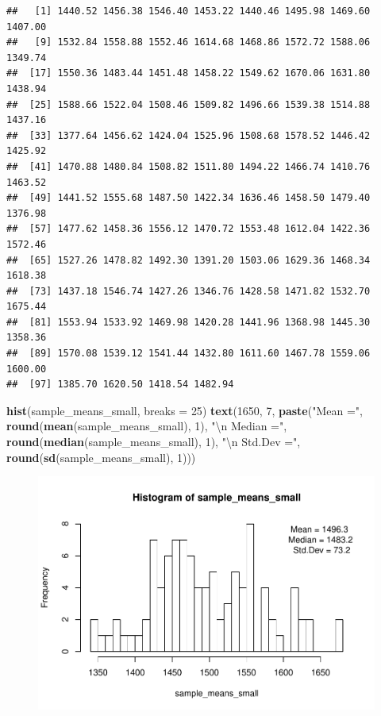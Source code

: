 \documentclass[]{article}
\newenvironment{Shaded}{\begin{snugshade}}{\end{snugshade}}
\newcommand{\KeywordTok}[1]{\textcolor[rgb]{0.13,0.29,0.53}{\textbf{{#1}}}}
\newcommand{\DataTypeTok}[1]{\textcolor[rgb]{0.13,0.29,0.53}{{#1}}}
\newcommand{\DecValTok}[1]{\textcolor[rgb]{0.00,0.00,0.81}{{#1}}}
\newcommand{\CharTok}[1]{\textcolor[rgb]{0.31,0.60,0.02}{{#1}}}
\newcommand{\StringTok}[1]{\textcolor[rgb]{0.31,0.60,0.02}{{#1}}}
\newcommand{\NormalTok}[1]{{#1}}
\begin{document}
\begin{verbatim}
##   [1] 1440.52 1456.38 1546.40 1453.22 1440.46 1495.98 1469.60 1407.00
##   [9] 1532.84 1558.88 1552.46 1614.68 1468.86 1572.72 1588.06 1349.74
##  [17] 1550.36 1483.44 1451.48 1458.22 1549.62 1670.06 1631.80 1438.94
##  [25] 1588.66 1522.04 1508.46 1509.82 1496.66 1539.38 1514.88 1437.16
##  [33] 1377.64 1456.62 1424.04 1525.96 1508.68 1578.52 1446.42 1425.92
##  [41] 1470.88 1480.84 1508.82 1511.80 1494.22 1466.74 1410.76 1463.52
##  [49] 1441.52 1555.68 1487.50 1422.34 1636.46 1458.50 1479.40 1376.98
##  [57] 1477.62 1458.36 1556.12 1470.72 1553.48 1612.04 1422.36 1572.46
##  [65] 1527.26 1478.82 1492.30 1391.20 1503.06 1629.36 1468.34 1618.38
##  [73] 1437.18 1546.74 1427.26 1346.76 1428.58 1471.82 1532.70 1675.44
##  [81] 1553.94 1533.92 1469.98 1420.28 1441.96 1368.98 1445.30 1358.36
##  [89] 1570.08 1539.12 1541.44 1432.80 1611.60 1467.78 1559.06 1600.00
##  [97] 1385.70 1620.50 1418.54 1482.94
\end{verbatim}

\begin{Shaded}
\begin{Highlighting}[]
\KeywordTok{hist}\NormalTok{(sample_means_small, }\DataTypeTok{breaks =} \DecValTok{25}\NormalTok{)}
\KeywordTok{text}\NormalTok{(}\DecValTok{1650}\NormalTok{, }\DecValTok{7}\NormalTok{, }\KeywordTok{paste}\NormalTok{(}\StringTok{"Mean ="}\NormalTok{, }\KeywordTok{round}\NormalTok{(}\KeywordTok{mean}\NormalTok{(sample_means_small), }\DecValTok{1}\NormalTok{), }\StringTok{"}\CharTok{\textbackslash{}n}\StringTok{ Median ="}\NormalTok{, }
         \KeywordTok{round}\NormalTok{(}\KeywordTok{median}\NormalTok{(sample_means_small), }\DecValTok{1}\NormalTok{), }\StringTok{"}\CharTok{\textbackslash{}n}\StringTok{ Std.Dev ="}\NormalTok{, }\KeywordTok{round}\NormalTok{(}\KeywordTok{sd}\NormalTok{(sample_means_small), }\DecValTok{1}\NormalTok{)))}
\end{Highlighting}
\end{Shaded}

\begin{figure}[htbp]
\centering
\includegraphics{Lab3A_files/figure-latex/forlooptest-1.pdf}
\caption{}
\end{figure}
\end{document}
